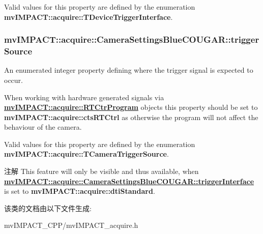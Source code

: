 Valid values for this property are defined by the enumeration {\bfseries mv\+I\+M\+P\+A\+C\+T\+::acquire\+::\+T\+Device\+Trigger\+Interface}. \hypertarget{classmv_i_m_p_a_c_t_1_1acquire_1_1_camera_settings_blue_c_o_u_g_a_r_adee3dae10aa14fd0f808d94133c847b4}{
\subsubsection[{trigger\+Source}]{ mv\+I\+M\+P\+A\+C\+T\+::acquire\+::\+Camera\+Settings\+Blue\+C\+O\+U\+G\+A\+R\+::trigger\+Source}}\label{classmv_i_m_p_a_c_t_1_1acquire_1_1_camera_settings_blue_c_o_u_g_a_r_adee3dae10aa14fd0f808d94133c847b4}


An enumerated integer property defining where the trigger signal is expected to occur. 

When working with hardware generated signals via {\bfseries \hyperlink{classmv_i_m_p_a_c_t_1_1acquire_1_1_r_t_ctr_program}{mv\+I\+M\+P\+A\+C\+T\+::acquire\+::\+R\+T\+Ctr\+Program}} objects this property should be set to {\bfseries mv\+I\+M\+P\+A\+C\+T\+::acquire\+::cts\+R\+T\+Ctrl} as otherwise the program will not affect the behaviour of the camera.

Valid values for this property are defined by the enumeration {\bfseries mv\+I\+M\+P\+A\+C\+T\+::acquire\+::\+T\+Camera\+Trigger\+Source}.

\begin{DoxyNote}{注解}
This feature will only be visible and thus available, when {\bfseries \hyperlink{classmv_i_m_p_a_c_t_1_1acquire_1_1_camera_settings_blue_c_o_u_g_a_r_a75591b5a8fc64719066e621a3b9adf47}{mv\+I\+M\+P\+A\+C\+T\+::acquire\+::\+Camera\+Settings\+Blue\+C\+O\+U\+G\+A\+R\+::trigger\+Interface}} is set to {\bfseries mv\+I\+M\+P\+A\+C\+T\+::acquire\+::dti\+Standard}. 
\end{DoxyNote}


该类的文档由以下文件生成\+:\begin{DoxyCompactItemize}
\item 
mv\+I\+M\+P\+A\+C\+T\+\_\+\+C\+P\+P/mv\+I\+M\+P\+A\+C\+T\+\_\+acquire.\+h\end{DoxyCompactItemize}
